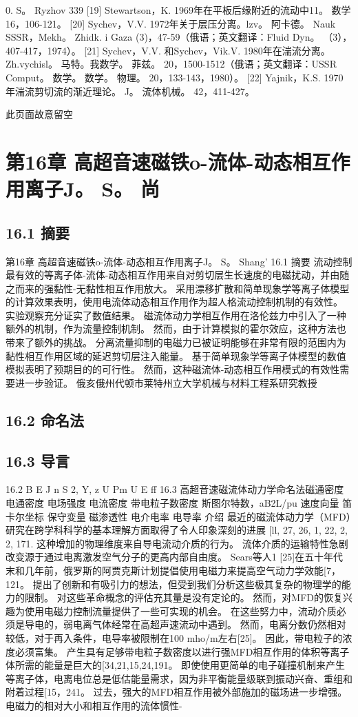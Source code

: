 \documentclass[UTF8,11pt,a4paper,openany,fontset=fandol]{ctexbook}
\begin{document}
0. S。 Ryzhov 339 [19] Stewartson，K. 1969年在平板后缘附近的流动中11。 数学16，106-121。 [20] Sychev，V.V. 1972年关于层压分离。lzv。 阿卡德。 Nauk SSSR，Mekh。 Zhidk. i Gaza (3)，47-59（俄语；英文翻译：Fluid Dyn。 （3），407-417，1974）。 [21] Sychev，V.V. 和Sychev，Vik.V. 1980年在湍流分离。 Zh.vychisl。 马特。我数学。 菲兹。 20，1500-1512（俄语；英文翻译：USSR Comput。 数学。 数学。 物理。 20，133-143，1980）。 [22] Yajnik，K.S. 1970年湍流剪切流的渐近理论。 J。 流体机械。 42，411-427。

此页面故意留空

\clearpage
\chapter{第16章 高超音速磁铁o-流体-动态相互作用离子J。 S。 尚}
\section{16.1 摘要}
第16章 高超音速磁铁o-流体-动态相互作用离子J。 S。 Shang' 16.1 摘要 流动控制最有效的等离子体-流体-动态相互作用来自对剪切层生长速度的电磁扰动，并由随之而来的强黏性-无黏性相互作用放大。 采用漂移扩散和简单现象学等离子体模型的计算效果表明，使用电流体动态相互作用作为超人格流动控制机制的有效性。 实验观察充分证实了数值结果。 磁流体动力学相互作用在洛伦兹力中引入了一种额外的机制，作为流量控制机制。 然而，由于计算模拟的霍尔效应，这种方法也带来了额外的挑战。 分离流量抑制的电磁力已被证明能够在非常有限的范围内为黏性相互作用区域的延迟剪切层注入能量。 基于简单现象学等离子体模型的数值模拟表明了预期目的的可行性。 然而，这种磁流体-动态相互作用模式的有效性需要进一步验证。 俄亥俄州代顿市莱特州立大学机械与材料工程系研究教授

\section{16.2 命名法}
\section{16.3 导言}
16.2 B E J n S 2, Y, z U Pm U E ff 16.3 高超音速磁流体动力学命名法磁通密度 电通密度 电场强度 电流密度 带电粒子数密度 斯图尔特数，aB2L/pu 速度向量 笛卡尔坐标 保守变量 磁渗透性 电介电率 电导率 介绍 最近的磁流体动力学（MFD）研究在跨学科科学的基本理解方面取得了令人印象深刻的进展 [ll, 27, 26, 1, 22, 2, 2, 171. 这种增加的物理维度来自导电流动介质的行为。 流体介质的运输特性急剧改变源于通过电离激发空气分子的更高内部自由度。 Sears等人1 [25]在五十年代末和几年前，俄罗斯的阿贾克斯计划提倡使用电磁力来提高空气动力学效能[7，121。 提出了创新和有吸引力的想法，但受到我们分析这些极其复杂的物理学的能力的限制。 对这些革命概念的评估充其量是没有定论的。 然而，对MFD的恢复兴趣为使用电磁力控制流量提供了一些可实现的机会。 在这些努力中，流动介质必须是导电的，弱电离气体经常在高超声速流动中遇到。 然而，电离分数仍然相对较低，对于再入条件，电导率被限制在100 mho/m左右[25]。 因此，带电粒子的浓度必须富集。 产生具有足够带电粒子数密度以进行强MFD相互作用的体积等离子体所需的能量是巨大的[34,21,15,24,191。 即使使用更简单的电子碰撞机制来产生等离子体，电离电位总是低估能量需求，因为非平衡能量级联到振动兴奋、重组和附着过程[15，241。 过去，强大的MFD相互作用被外部施加的磁场进一步增强。 电磁力的相对大小和相互作用的流体惯性-
\end{document}
